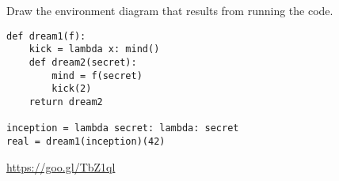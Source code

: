 \begin{blocksection}
\question Draw the environment diagram that results from running the code.

\begin{lstlisting}
def dream1(f):
    kick = lambda x: mind()
    def dream2(secret):
        mind = f(secret)
        kick(2)
    return dream2

inception = lambda secret: lambda: secret
real = dream1(inception)(42)
\end{lstlisting}

\begin{solution}[2in]
\url{https://goo.gl/TbZ1ql}
\end{solution}
\end{blocksection}
